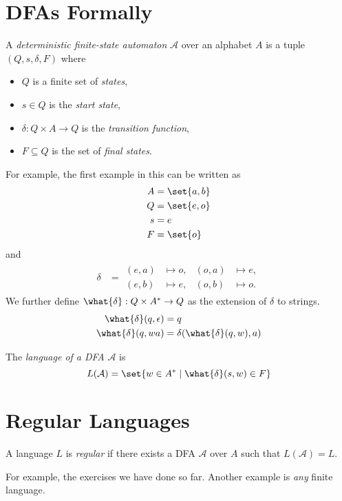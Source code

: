 \section{DFAs Formally} \label{sec:dfa:formal}
\begin{definition*}[DFA] \label{def:dfa}
    A \emph{deterministic finite-state automaton} $\mathcal{A}$ over an
    alphabet $A$ is a tuple $(Q, s, \delta, F)$ where
    \begin{itemize}
        \item $Q$ is a finite set of \emph{states},
        \item $s \in Q$ is the \emph{start state},
        \item $\delta: Q \times A \to Q$ is the \emph{transition function},
        \item $F \subseteq Q$ is the set of \emph{final states}.
    \end{itemize}
\end{definition*}
For example, the first example in this  can be written as
\begin{align*}
    A &= \set{a, b} \\
    Q &= \set{e, o} \\
    s &= e \\
    F &= \set{o}
\end{align*} and \begin{align*}
    \delta &= \begin{aligned}
        (e, a) &\mapsto o, & (o, a) &\mapsto e, \\
        (e, b) &\mapsto e, & (o, b) &\mapsto o.
    \end{aligned}
\end{align*}
We further define $\what{\delta} : Q \times A^* \to Q$ as the extension of
$\delta$ to strings.
\begin{align*}
    \what{\delta}(q, \epsilon) &= q \\
    \what{\delta}(q, wa) &= \delta(\what{\delta}(q, w), a)
\end{align*}
\begin{definition*} \label{def:dfa:lang}
    The \emph{language of a DFA} $\mathcal{A}$ is
    \begin{equation*}
        L(\mathcal{A}) = \set{w \in A^* \mid \what{\delta}(s, w) \in F}
    \end{equation*}
\end{definition*}

\section{Regular Languages} \label{sec:dfa:regular}
\vspace{1em}
\begin{definition*} \label{def:regular}
    A language $L$ is \emph{regular} if there exists a DFA $\mathcal{A}$
    over $A$ such that $L(\mathcal{A}) = L$.
\end{definition*}
For example, the exercises we have done so far.
Another example is \emph{any} finite language.

